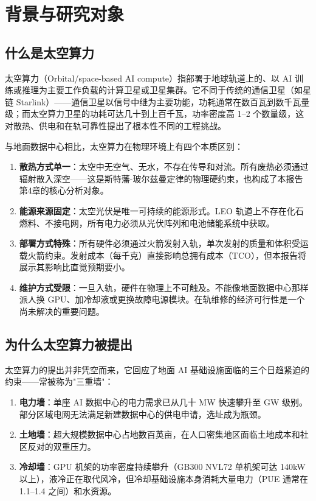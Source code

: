 
\section{背景与研究对象}

\subsection{什么是太空算力}

太空算力（Orbital/space-based AI compute）指部署于地球轨道上的、以 AI 训练或推理为主要工作负载的计算卫星或卫星集群。它不同于传统的通信卫星（如星链 Starlink）——通信卫星以信号中继为主要功能，功耗通常在数百瓦到数千瓦量级；而太空算力卫星的功耗可达几十到上百千瓦，功率密度高 1--2 个数量级，这对散热、供电和在轨可靠性提出了根本性不同的工程挑战。

与地面数据中心相比，太空算力在物理环境上有四个本质区别：

\begin{enumerate}[leftmargin=*]
    \item \textbf{散热方式单一}：太空中无空气、无水，不存在传导和对流。所有废热必须通过辐射散入深空——这是斯特藩-玻尔兹曼定律的物理硬约束，也构成了本报告第4章的核心分析对象。
    \item \textbf{能源来源固定}：太空光伏是唯一可持续的能源形式。LEO 轨道上不存在化石燃料、不接电网，所有电力必须从光伏阵列和电池储能系统中获取。
    \item \textbf{部署方式特殊}：所有硬件必须通过火箭发射入轨，单次发射的质量和体积受运载火箭约束。发射成本（每千克）直接影响总拥有成本（TCO），但本报告将展示其影响比直觉预期要小。
    \item \textbf{维护方式受限}：一旦入轨，硬件在物理上不可触及。不能像地面数据中心那样派人换 GPU、加冷却液或更换故障电源模块。在轨维修的经济可行性是一个尚未解决的重要问题。
\end{enumerate}

\subsection{为什么太空算力被提出}

太空算力的提出并非凭空而来，它回应了地面 AI 基础设施面临的三个日趋紧迫的约束——常被称为"三重墙"：

\begin{enumerate}[leftmargin=*]
    \item \textbf{电力墙}：单座 AI 数据中心的电力需求已从几十 MW 快速攀升至 GW 级别。部分区域电网无法满足新建数据中心的供电申请，选址成为瓶颈。
    \item \textbf{土地墙}：超大规模数据中心占地数百英亩，在人口密集地区面临土地成本和社区反对的双重压力。
    \item \textbf{冷却墙}：GPU 机架的功率密度持续攀升（GB300 NVL72 单机架可达 140\;kW 以上），液冷正在取代风冷，但冷却基础设施本身消耗大量电力（PUE 通常在 1.1--1.4 之间）和水资源。
\end{enumerate}

